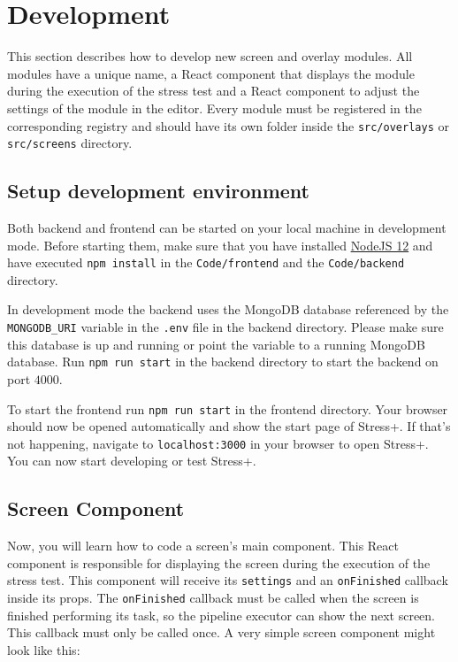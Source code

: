 \section{Development}
\label{sec:development}

This section describes how to develop new screen and overlay modules.
All modules have a unique name, a React component that displays the module during the execution of the stress test and a React component to adjust the settings of the module in the editor. 
Every module must be registered in the corresponding registry and should have its own folder inside the \texttt{src/overlays} or \texttt{src/screens} directory.

\subsection{Setup development environment}
Both backend and frontend can be started on your local machine in development mode.
Before starting them, make sure that you have installed \href{https://nodejs.org}{NodeJS 12} and have executed \texttt{npm install} in the \texttt{Code/frontend} and the \texttt{Code/backend} directory.

In development mode the backend uses the MongoDB database referenced by the \texttt{MONGODB\_URI} variable in the \texttt{.env} file in the backend directory.
Please make sure this database is up and running or point the variable to a running MongoDB database.
Run \texttt{npm run start} in the backend directory to start the backend on port $4000$.

To start the frontend run \texttt{npm run start} in the frontend directory.
Your browser should now be opened automatically and show the start page of Stress+.
If that's not happening, navigate to \texttt{localhost:3000} in your browser to open Stress+.
You can now start developing or test Stress+.

\subsection{Screen Component}
\label{sec:development-screens}

Now, you will learn how to code a screen's main component. 
This React component is responsible for displaying the screen during the execution of the stress test.
This component will receive its \texttt{settings} and an \texttt{onFinished} callback inside its props. 
The \texttt{onFinished} callback must be called when the screen is finished performing its task, so the pipeline executor can show the next screen. 
This callback must only be called once. 
A very simple screen component might look like this:

